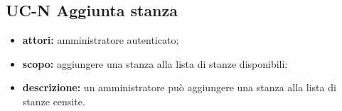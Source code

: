 \subsection{UC-N Aggiunta stanza}
\begin{itemize}
    \item \textbf{attori:} amministratore autenticato;
    \item \textbf{scopo:} aggiungere una stanza alla lista di stanze disponibili;
    \item \textbf{descrizione:} un amministratore pu\`{o} aggiungere una stanza alla lista di stanze censite.
\end{itemize}